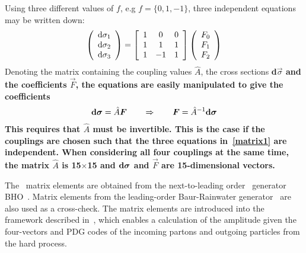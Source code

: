Using three different values of $f$, e.g $f=\{0,1,-1\}$, three independent
equations may be written down:
\begin{eqnarray}\label{matrix1}
\left(\begin{array}{c}
{\rm d}\sigma_1\\
{\rm d}\sigma_2\\
{\rm d}\sigma_3
\end{array}\right) =
\left[\begin{array}{ccc}
1 & 0 & 0 \\
1 & 1 & 1 \\
1 & -1 & 1
\end{array}\right]
\left(\begin{array}{c}
F_0\\
F_1\\
F_2
\end{array}\right)
\end{eqnarray}
Denoting the matrix containing the coupling values $\hat{A}$, the cross sections
\bf{d}$\vec{\sigma}$ and the coefficients $\vec{F}$, the equations are easily
manipulated to give the coefficients 
\begin{eqnarray}\label{matrix2} {\rm
\bf d}\vec{\sigma}=\hat{A}\vec{F} \qquad \Rightarrow \qquad \vec{F}=\hat{A}^{-1}{\rm
\bf d}\vec{\sigma} 
\end{eqnarray} 
This requires that $\hat{A}$ must be invertible. This is the
case if the couplings are chosen such that the three equations in~\ref{matrix1}
are independent. When considering all four couplings at the same time, the
matrix $\hat{A}$ is 15$\times$15 and ${\rm \bf d}\vec{\sigma}$ and $\vec{F}$ are
15-dimensional vectors.

The \TGC\ matrix elements are obtained from the next-to-leading order \mc\
generator BHO~\cite{bho}. Matrix elements from the leading-order Baur-Rainwater
generator~\cite{Baur:1994au} are also used as a cross-check. The matrix
elements are introduced into the  framework described in~\cite{Bella:2008wc},
which enables a calculation of the amplitude given the four-vectors and PDG
codes of the incoming partons and outgoing particles from the hard process. 

